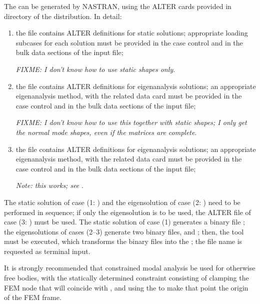 \noindent
The  can be generated by NASTRAN, using
the ALTER cards provided in directory  
of the distribution.
In detail:
\begin{enumerate}
\item the file  contains
	ALTER definitions for static solutions; appropriate
	loading subcases for each solution must be provided
	in the case control and in the bulk data sections
	of the input file;

	\emph{FIXME: I don't know how to use static shapes only}.

\item the file  contains
	ALTER definitions for eigenanalysis solutions;
	an appropriate eigenanalysis method, with the related
	data card must be provided in the case control 
	and in the bulk data sections of the input file;

	\emph{FIXME: I don't know how to use this together
		with static shapes; I only get the normal mode shapes,
		even if the matrices are complete}.

\item the file  contains
	ALTER definitions for eigenanalysis solutions;
	an appropriate eigenanalysis method, with the related
	data card must be provided in the case control 
	and in the bulk data sections of the input file;

	\emph{Note: this works; see} .

\end{enumerate}
The static solution of case (1: ) and the eigensolution
of case (2: ) need to be performed in sequence; 
if only the eigensolution is to be used, the ALTER file 
of case (3: ) must be used.
The static solution of case (1) generates a binary file ;
the eigensolutions of cases (2--3) generate two binary files, 
 and ; then, the tool  
must be executed, which transforms the binary files into 
the ; the file name is requested as terminal input.

\noindent
It is strongly recommended that constrained modal analysis
be used for otherwise free bodies, with the statically 
determined constraint consisting of clamping the FEM node 
that will coincide with , and using
the  to make that point the origin of the FEM frame.


